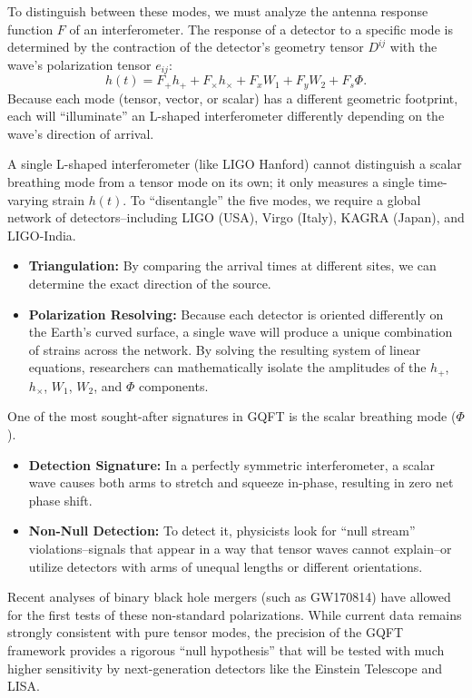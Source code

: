 To distinguish between these modes, we must analyze the antenna response function $F$ of an interferometer. The response of a detector to a specific mode is determined by the contraction of the detector's geometry tensor $D^{ij}$ with the wave's polarization tensor $e_{ij}$:
\[%
  h(t) = F_+ h_+ + F_\times h_\times + F_x W_1 + F_y W_2 + F_s \Phi
.\]%
Because each mode (tensor, vector, or scalar) has a different geometric footprint, each will ``illuminate'' an L-shaped interferometer differently depending on the wave's direction of arrival.

A single L-shaped interferometer (like LIGO Hanford) cannot distinguish a scalar breathing mode from a tensor mode on its own; it only measures a single time-varying strain $h(t)$. To ``disentangle'' the five modes, we require a global network of detectors--including LIGO (USA), Virgo (Italy), KAGRA (Japan), and LIGO-India.
\begin{itemize}
  \item \textbf{Triangulation:} By comparing the arrival times at different sites, we can determine the exact direction of the source.
  \item \textbf{Polarization Resolving:} Because each detector is oriented differently on the Earth's curved surface, a single wave will produce a unique combination of strains across the network. By solving the resulting system of linear equations, researchers can mathematically isolate the amplitudes of the $h_+$, $h_\times$, $W_1$, $W_2$, and $\Phi$ components.
\end{itemize}

One of the most sought-after signatures in GQFT is the scalar breathing mode ($\Phi$).
\begin{itemize}
  \item \textbf{Detection Signature:} In a perfectly symmetric interferometer, a scalar wave causes both arms to stretch and squeeze in-phase, resulting in zero net phase shift.
  \item \textbf{Non-Null Detection:} To detect it, physicists look for ``null stream'' violations--signals that appear in a way that tensor waves cannot explain--or utilize detectors with arms of unequal lengths or different orientations.
\end{itemize}

Recent analyses of binary black hole mergers (such as GW170814) have allowed for the first tests of these non-standard polarizations. While current data remains strongly consistent with pure tensor modes, the precision of the GQFT framework provides a rigorous ``null hypothesis'' that will be tested with much higher sensitivity by next-generation detectors like the Einstein Telescope and LISA.

